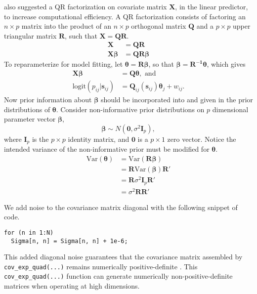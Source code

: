 \documentclass{article}
\begin{document}
\cite{Trangucci} also suggested a QR factorization on covariate matrix $\pmb{X}$, in the linear predictor, to increase computational efficiency. A QR factorization consists of factoring an $n \times p$ matrix into the product of an $n \times p$ orthogonal matrix $\pmb{Q}$ and a $p \times p$ upper triangular matrix $\pmb{R}$, such that $\pmb{X} = \pmb{QR}$. 
\begin{align}
\pmb{X} &= \pmb{QR} \\
\pmb{X \beta} &= \pmb{QR \beta}
\end{align}
To reparameterize for model fitting, let $\pmb{\theta} = \pmb{R \beta}$, so that $\pmb{\beta} = \pmb{R^{-1}\theta}$, which gives
\begin{align}
\pmb{X \beta} &= \pmb{Q \theta}, \text{ and } \\
\text{logit}(p_{ij}|\pmb{s}_{ij}) &= \pmb{Q}_{ij}(\pmb{s}_{ij}) \pmb{\theta}_{j} + w_{ij}.
\end{align}
Now prior information about $\pmb{\beta}$ should be incorporated into and given in the prior distributions of $\pmb{\theta}$. Consider non-informative prior distributions on $p$ dimensional parameter vector $\pmb{\beta}$,
$$ \pmb{\beta} \sim N(\pmb{0}, \sigma^{2}\pmb{I}_{p}), $$
where $\pmb{I}_{p}$ is the $p \times p$ identity matrix, and $\pmb{0}$ is a $p \times 1$ zero vector. Notice the intended variance of the non-informative prior must be modified for $\pmb{\theta}$.
\begin{align}
\text{Var}(\pmb{\theta}) &= \text{Var}(\pmb{R \beta}) \\
&= \pmb{R}\text{Var}(\pmb{\beta})\pmb{R}' \\
&= \pmb{R}\sigma^{2}\pmb{I}_{p}\pmb{R}' \\
&= \sigma^{2} \pmb{R}\pmb{R}'
\end{align}

We add noise to the covariance matrix diagonal with the following snippet of code.
\begin{verbatim}
for (n in 1:N)
  Sigma[n, n] = Sigma[n, n] + 1e-6;
\end{verbatim}
This added diagonal noise guarantees that the covariance matrix assembled by \verb|cov_exp_quad(...)| remains numerically positive-definite \cite{Trangucci2017}. This \verb|cov_exp_quad(...)| function can generate numerically non-positive-definite matrices when operating at high dimensions.
\end{document}
